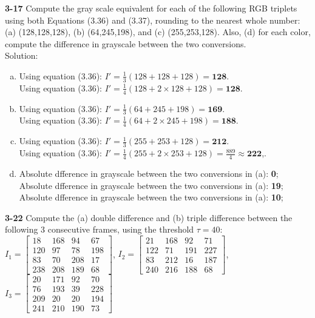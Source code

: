 \documentclass[a4paper]{article}
\begin{document}
\begin{spacing}{2.0}
	\noindent
	\textbf{3-17} Compute the gray scale equivalent for each of the following RGB triplets using both Equations (3.36) and (3.37), rounding to the nearest whole number: (a) (128,128,128), (b) (64,245,198), and (c) (255,253,128). Also, (d) for each color, compute the difference in grayscale between the two conversions.\\
	Solution:
	\begin{enumerate}[(a)]
		\item Using equation (3.36): $I' = \displaystyle\frac{1}{3}(128+128+128) = \mathbf{128}$.\\
		         Using equation (3.36): $I' = \displaystyle\frac{1}{4}(128+2\times128+128) = \mathbf{128}$.
		\item Using equation (3.36): $I' = \displaystyle\frac{1}{3}(64+245+198) = \mathbf{169}$.\\
		         Using equation (3.36): $I' = \displaystyle\frac{1}{4}(64+2\times245+198) = \mathbf{188}$.
		\item Using equation (3.36): $I' = \displaystyle\frac{1}{3}(255+253+128) = \mathbf{212}$.\\
		         Using equation (3.36): $I' = \displaystyle\frac{1}{4}(255+2\times253+128) = \displaystyle\frac{889}{4} \approx \mathbf{222}$,.
		\item Absolute dfference in grayscale between the two conversions in (a): \textbf{0}; \\
		         Absolute dfference in grayscale between the two conversions in (a): \textbf{19}; \\
		         Absolute dfference in grayscale between the two conversions in (a): \textbf{10}; 		
	\end{enumerate}
	
	\noindent
	\textbf{3-22} Compute the (a) double difference and (b) triple difference between the following 3 consecutive frames, using the threshold $\tau = 40$:\\
	
	$I_1 = \begin{bmatrix} 18 & 168 & 94 & 67 \\ 120 & 97 & 78 & 198 \\ 83 & 70 & 208 & 17 \\238 & 208 & 189 & 68 \end{bmatrix}$, 
	$I_2 = \begin{bmatrix} 21 & 168 & 92 & 71 \\ 122 & 71 & 191 & 227 \\ 83 & 212 & 16 & 187 \\240 & 216 & 188 & 68 \end{bmatrix}$, 
	$I_3 = \begin{bmatrix} 20 & 171 & 92 & 70 \\ 76 & 193 & 39 & 228 \\209 & 20 & 20 & 194 \\241 & 210 & 190 & 73 \end{bmatrix}$\\
	

\end{spacing}
\end{document}
